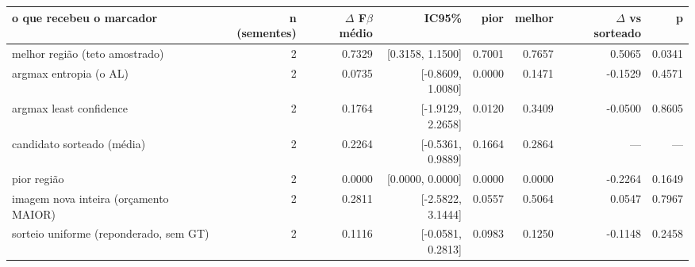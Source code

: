 \begin{tabular}{lrrrrrrr}
\hline
o que recebeu o marcador & n (sementes) & $\Delta$ F$\beta$ médio & IC95\% & pior & melhor & $\Delta$ vs sorteado & p \\
\hline
melhor região (teto amostrado) & 2 & 0.7329 & [0.3158, 1.1500] & 0.7001 & 0.7657 & 0.5065 & 0.0341 \\
argmax entropia (o AL) & 2 & 0.0735 & [-0.8609, 1.0080] & 0.0000 & 0.1471 & -0.1529 & 0.4571 \\
argmax least confidence & 2 & 0.1764 & [-1.9129, 2.2658] & 0.0120 & 0.3409 & -0.0500 & 0.8605 \\
candidato sorteado (média) & 2 & 0.2264 & [-0.5361, 0.9889] & 0.1664 & 0.2864 & --- & --- \\
pior região & 2 & 0.0000 & [0.0000, 0.0000] & 0.0000 & 0.0000 & -0.2264 & 0.1649 \\
imagem nova inteira (orçamento MAIOR) & 2 & 0.2811 & [-2.5822, 3.1444] & 0.0557 & 0.5064 & 0.0547 & 0.7967 \\
sorteio uniforme (reponderado, sem GT) & 2 & 0.1116 & [-0.0581, 0.2813] & 0.0983 & 0.1250 & -0.1148 & 0.2458 \\
\hline
\end{tabular}

